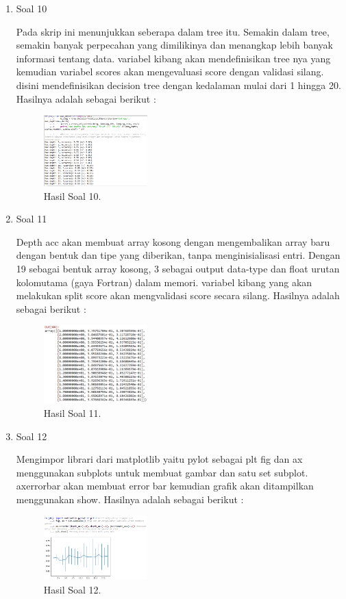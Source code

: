 \begin{enumerate}
	\item Soal 10
	\hfill\break
	
	Pada skrip ini menunjukkan seberapa dalam tree itu. Semakin dalam tree, semakin banyak perpecahan yang dimilikinya dan menangkap lebih banyak informasi tentang data. variabel kibang akan mendefinisikan tree nya yang kemudian variabel scores akan mengevaluasi score dengan validasi silang. disini mendefinisikan decision tree dengan kedalaman mulai dari 1 hingga 20. Hasilnya adalah sebagai berikut :
	\begin{figure}[H]
	\centering
		\includegraphics[width=4cm]{figures/1174008/2/hasilsoal10.PNG}
		\caption{Hasil Soal 10.}
	\end{figure}

	\item Soal 11
	\hfill\break
	
	Depth acc akan membuat array kosong dengan mengembalikan array baru dengan bentuk dan tipe yang diberikan, tanpa menginisialisasi entri. Dengan 19 sebagai bentuk array kosong, 3 sebagai output data-type dan float urutan kolomutama (gaya Fortran) dalam memori. variabel kibang yang akan melakukan split score akan mengvalidasi score secara silang. Hasilnya adalah sebagai berikut :
	\begin{figure}[H]
	\centering
		\includegraphics[width=4cm]{figures/1174008/2/hasilsoal11.PNG}
		\caption{Hasil Soal 11.}
	\end{figure}

	\item Soal 12
	\hfill\break
	
	Mengimpor librari dari matplotlib yaitu pylot sebagai plt fig dan ax menggunakan subplots untuk membuat gambar dan satu set subplot. axerrorbar akan membuat error bar kemudian grafik akan ditampilkan menggunakan show. Hasilnya adalah sebagai berikut :
	\begin{figure}[H]
	\centering
		\includegraphics[width=4cm]{figures/1174008/2/hasilsoal12.PNG}
		\caption{Hasil Soal 12.}
	\end{figure}
\end{enumerate}


